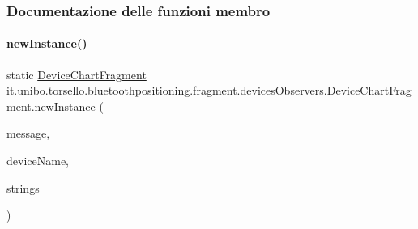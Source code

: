 \subsubsection{Documentazione delle funzioni membro}
\hypertarget{classit_1_1unibo_1_1torsello_1_1bluetoothpositioning_1_1fragment_1_1devicesObservers_1_1DeviceChartFragment_ac3a29d125bf39a859054cca378274185_ac3a29d125bf39a859054cca378274185}{}\label{classit_1_1unibo_1_1torsello_1_1bluetoothpositioning_1_1fragment_1_1devicesObservers_1_1DeviceChartFragment_ac3a29d125bf39a859054cca378274185_ac3a29d125bf39a859054cca378274185} 
\paragraph{\texorpdfstring{new\+Instance()}{newInstance()}}
{\footnotesize\ttfamily static \hyperlink{classit_1_1unibo_1_1torsello_1_1bluetoothpositioning_1_1fragment_1_1devicesObservers_1_1DeviceChartFragment}{Device\+Chart\+Fragment} it.\+unibo.\+torsello.\+bluetoothpositioning.\+fragment.\+devices\+Observers.\+Device\+Chart\+Fragment.\+new\+Instance (\begin{DoxyParamCaption}\item[{String}]{message,  }\item[{String}]{device\+Name,  }\item[{Array\+List$<$ String $>$}]{strings }\end{DoxyParamCaption})\hspace{0.3cm}{\ttfamily [static]}}


